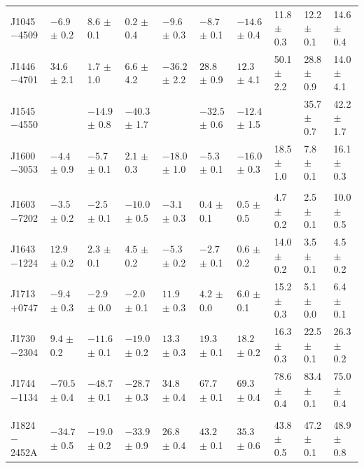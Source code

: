 \begin{landscape}
\begin{table}
\begin{center}
\begin{tabular}{p{1.9cm}p{1.88cm}p{1.88cm}p{1.88cm}p{1.88cm}p{1.88cm}p{1.88cm}p{1.8cm}p{1.8cm}p{1.8cm}}
J1045$-$4509 &$-6.9 $ $\pm$ 0.2 & $8.6  $ $\pm$ 0.1 & $0.2  $ $\pm$ 0.4 & $-9.6 $ $\pm$ 0.3 & $-8.7 $ $\pm$ 0.1 & $-14.6$ $\pm$ 0.4 & 11.8 $\pm$ 0.3 & 12.2 $\pm$ 0.1 & 14.6 $\pm$ 0.4 \\
J1446$-$4701 &$34.6 $ $\pm$ 2.1 & $1.7  $ $\pm$ 1.0 & $6.6  $ $\pm$ 4.2 & $-36.2$ $\pm$ 2.2 & $28.8 $ $\pm$ 0.9 & $12.3 $ $\pm$ 4.1 & 50.1 $\pm$ 2.2 & 28.8 $\pm$ 0.9 & 14.0 $\pm$ 4.1 \\
J1545$-$4550 &                  & $-14.9$ $\pm$ 0.8 & $-40.3$ $\pm$ 1.7 &                   & $-32.5$ $\pm$ 0.6 & $-12.4$ $\pm$ 1.5 &                & 35.7 $\pm$ 0.7 & 42.2 $\pm$ 1.7 \\
J1600$-$3053 &$-4.4 $ $\pm$ 0.9 & $-5.7 $ $\pm$ 0.1 & $2.1  $ $\pm$ 0.3 & $-18.0$ $\pm$ 1.0 & $-5.3 $ $\pm$ 0.1 & $-16.0$ $\pm$ 0.3 & 18.5 $\pm$ 1.0 & 7.8  $\pm$ 0.1 & 16.1 $\pm$ 0.3 \\
             &                &                 &                &                   &                   &                   &                &                &                 \\
J1603$-$7202 &$-3.5 $ $\pm$ 0.2 & $-2.5 $ $\pm$ 0.1 & $-10.0$ $\pm$ 0.5 & $-3.1 $ $\pm$ 0.3 & $0.4  $ $\pm$ 0.1 & $0.5  $ $\pm$ 0.5 & 4.7  $\pm$ 0.2 & 2.5  $\pm$ 0.1 & 10.0 $\pm$ 0.5 \\
J1643$-$1224 &$12.9 $ $\pm$ 0.2 & $2.3  $ $\pm$ 0.1 & $4.5  $ $\pm$ 0.2 & $-5.3 $ $\pm$ 0.2 & $-2.7 $ $\pm$ 0.1 & $0.6  $ $\pm$ 0.2 & 14.0 $\pm$ 0.2 & 3.5  $\pm$ 0.1 & 4.5  $\pm$ 0.2 \\
J1713$+$0747 &$-9.4 $ $\pm$ 0.3 & $-2.9 $ $\pm$ 0.0 & $-2.0 $ $\pm$ 0.1 & $11.9 $ $\pm$ 0.3 & $4.2  $ $\pm$ 0.0 & $6.0  $ $\pm$ 0.1 & 15.2 $\pm$ 0.3 & 5.1  $\pm$ 0.0 & 6.4  $\pm$ 0.1 \\
J1730$-$2304 &$9.4  $ $\pm$ 0.2 & $-11.6$ $\pm$ 0.1 & $-19.0$ $\pm$ 0.2 & $13.3 $ $\pm$ 0.3 & $19.3 $ $\pm$ 0.1 & $18.2 $ $\pm$ 0.2 & 16.3 $\pm$ 0.3 & 22.5 $\pm$ 0.1 & 26.3 $\pm$ 0.2 \\
J1744$-$1134 &$-70.5$ $\pm$ 0.4 & $-48.7$ $\pm$ 0.1 & $-28.7$ $\pm$ 0.3 & $34.8 $ $\pm$ 0.4 & $67.7 $ $\pm$ 0.1 & $69.3 $ $\pm$ 0.4 & 78.6 $\pm$ 0.4 & 83.4 $\pm$ 0.1 & 75.0 $\pm$ 0.4 \\
             &                &                 &                &                   &                   &                   &                &                &                 \\
J1824$-$2452A&$-34.7$ $\pm$ 0.5 & $-19.0$ $\pm$ 0.2 & $-33.9$ $\pm$ 0.9 & $26.8 $ $\pm$ 0.4 & $43.2 $ $\pm$ 0.1 & $35.3 $ $\pm$ 0.6 & 43.8 $\pm$ 0.5 & 47.2 $\pm$ 0.1 & 48.9 $\pm$ 0.8 \\

\end{tabular}
\end{center}
\end{table}
\end{landscape}
